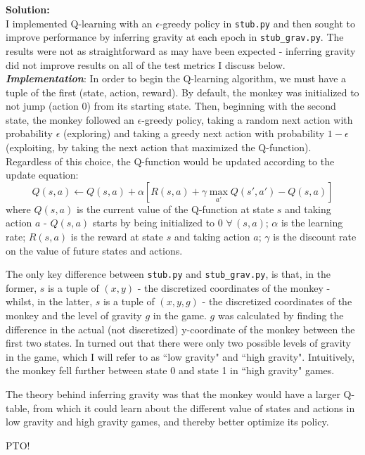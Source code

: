\documentclass[submit]{harvardml}
\begin{document}
\textbf{Solution:}\\
I implemented Q-learning with an $\epsilon$-greedy policy in \texttt{stub.py} and then sought to improve performance by inferring gravity at each epoch in \texttt{stub\_grav.py}. The results were not as straightforward as may have been expected - inferring gravity did not improve results on all of the test metrics I discuss below.\\

\textit{\textbf{Implementation}}:
In order to begin the Q-learning algorithm, we must have a tuple of the first (state, action, reward). By default, the monkey was initialized to not jump (action 0) from its starting state. Then, beginning with the second state, the monkey followed an $\epsilon$-greedy policy, taking a random next action with probability $\epsilon$ (exploring) and taking a greedy next action with probability $1 - \epsilon$ (exploiting, by taking the next action that maximized the Q-function). Regardless of this choice, the Q-function would be updated according to the update equation:
$$Q(s,a) \leftarrow Q(s,a) + \alpha[R(s,a) + \gamma \max_{a'} Q(s',a') - Q(s,a)] $$
where $Q(s,a)$ is the current value of the Q-function at state $s$ and taking action $a$ - $Q(s,a)$ starts by being initialized to 0 $\forall\, (s,a)$; $\alpha$ is the learning rate; $R(s,a)$ is the reward at state $s$ and taking action $a$; $\gamma$ is the discount rate on the value of future states and actions.

The only key difference between \texttt{stub.py} and \texttt{stub\_grav.py}, is that, in the former, $s$ is a tuple of $(x,y)$ - the discretized coordinates of the monkey - whilst, in the latter, $s$ is a tuple of $(x,y,g)$ - the discretized coordinates of the monkey and the level of gravity $g$ in the game. $g$ was calculated by finding the difference in the actual (not discretized) y-coordinate of the monkey between the first two states. In turned out that there were only two possible levels of gravity in the game, which I will refer to as ``low gravity" and ``high gravity". Intuitively, the monkey fell further between state 0 and state 1 in ``high gravity" games.

The theory behind inferring gravity was that the monkey would have a larger Q-table, from which it could learn about the different value of states and actions in low gravity and high gravity games, and thereby better optimize its policy.\\

\begin{center}
    PTO!
\end{center}
\newpage
\end{document}
